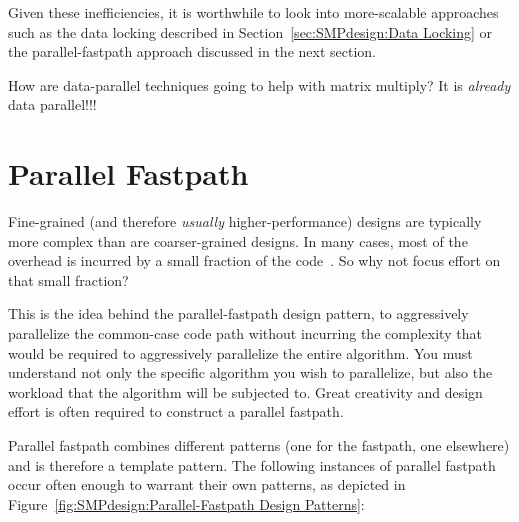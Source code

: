 Given these inefficiencies,
it is worthwhile to look into more-scalable approaches
such as the data locking described in
Section~\ref{sec:SMPdesign:Data Locking}
or the parallel-fastpath approach discussed in the next section.

\QuickQuiz{}
	How are data-parallel techniques going to help with matrix
	multiply?
	It is \emph{already} data parallel!!!
 \QuickQuizEnd

\section{Parallel Fastpath}
\label{sec:SMPdesign:Parallel Fastpath}

Fine-grained (and therefore \emph{usually} higher-performance)
designs are typically more complex than are coarser-grained designs.
In many cases, most of the overhead is incurred by a small fraction
of the code~\cite{Knuth73}.
So why not focus effort on that small fraction?

This is the idea behind the parallel-fastpath design pattern, to aggressively
parallelize the common-case code path without incurring the complexity
that would be required to aggressively parallelize the entire algorithm.
You must understand not only the specific algorithm you wish
to parallelize, but also the workload that the algorithm will
be subjected to.  Great creativity and design
effort is often required to construct a parallel fastpath.

Parallel fastpath combines different patterns (one for the
fastpath, one elsewhere) and is therefore a template pattern.
The following instances of parallel
fastpath occur often enough to warrant their own patterns,
as depicted in Figure~\ref{fig:SMPdesign:Parallel-Fastpath Design Patterns}:

